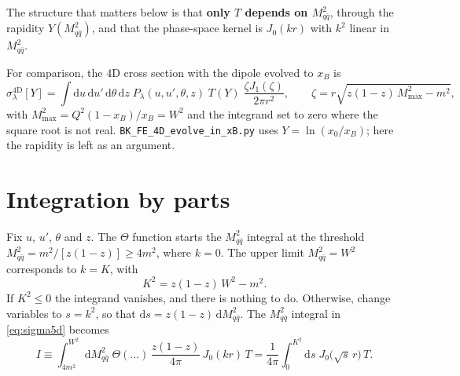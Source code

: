 \documentclass[11pt,a4paper]{article}
\newcommand{\Mqq}{M_{q\bar q}^2}
\newcommand{\dd}{\mathrm{d}}
\begin{document}
The structure that matters below is that \textbf{only $T$ depends on $\Mqq$},
through the rapidity $Y(\Mqq)$, and that the phase-space kernel is $J_0(kr)$
with $k^2$ linear in $\Mqq$.

For comparison, the 4D cross section with the dipole evolved to $x_B$ is
\begin{equation}
  \sigma_\lambda^{\text{4D}}[Y]
  = \int \dd u \, \dd u' \, \dd\theta \, \dd z \;
    P_\lambda(u, u', \theta, z) \; T(Y) \;
    \frac{\zeta J_1(\zeta)}{2\pi r^2} ,
  \qquad
  \zeta = r \sqrt{z(1-z) \, M_{\max}^2 - m^2} ,
  \label{eq:sigma4d}
\end{equation}
with $M_{\max}^2 = Q^2 (1 - x_B)/x_B = W^2$ and the integrand set to zero where
the square root is not real. \texttt{BK\_FE\_4D\_evolve\_in\_xB.py} uses
$Y = \ln(x_0/x_B)$; here the rapidity is left as an argument.

\section{Integration by parts}

Fix $u$, $u'$, $\theta$ and $z$. The $\Theta$ function starts the $\Mqq$
integral at the threshold $\Mqq = m^2/[z(1-z)] \geq 4m^2$, where $k = 0$. The
upper limit $\Mqq = W^2$ corresponds to $k = K$, with
\begin{equation}
  K^2 = z(1-z) \, W^2 - m^2 .
\end{equation}
If $K^2 \leq 0$ the integrand vanishes, and there is nothing to do. Otherwise,
change variables to $s = k^2$, so that $\dd s = z(1-z) \, \dd\Mqq$. The
$\Mqq$ integral in \eqref{eq:sigma5d} becomes
\begin{equation}
  I \equiv \int_{4m^2}^{W^2} \dd\Mqq \;
    \Theta(\ldots) \, \frac{z(1-z)}{4\pi} \, J_0(kr) \, T
  = \frac{1}{4\pi} \int_0^{K^2} \dd s \; J_0\big(\sqrt{s}\, r\big) \, T .
\end{equation}
\end{document}
